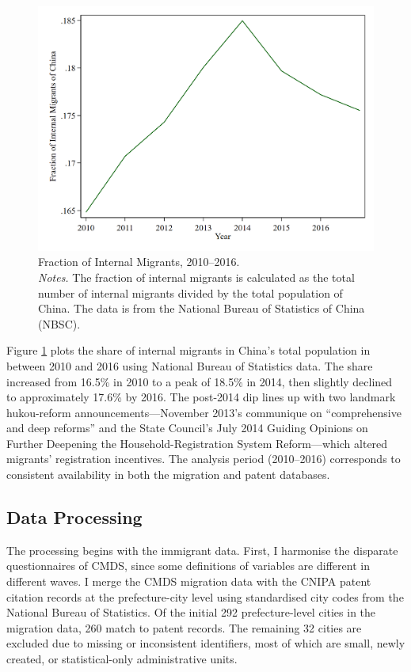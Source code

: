 \documentclass[12pt]{article}
\begin{document}
\begin{figure}[!htbp]
 \centering
 \includegraphics[width=.6\textwidth]{../Analysis/output/fraction_of_internal_migrants.png}
 \caption{Fraction of Internal Migrants, 2010--2016. \vspace{1ex} \\
    {\footnotesize \emph{Notes.} The fraction of internal migrants is calculated as the total number of internal migrants divided by the total population of China. The data is from the National Bureau of Statistics of China (NBSC).}}
  \label{fig:Fraction_of_Internal_Migrants}
\end{figure}
Figure \ref{fig:Fraction_of_Internal_Migrants} plots the share of internal migrants in China's total population in between 2010 and 2016 using National Bureau of Statistics data. The share increased from 16.5\% in 2010 to a peak of 18.5\% in 2014, then slightly declined to approximately 17.6\% by 2016. The post-2014 dip lines up with two landmark hukou-reform announcements—November 2013's communique on “comprehensive and deep reforms” and the State Council's July 2014 Guiding Opinions on Further Deepening the Household-Registration System Reform—which altered migrants' registration incentives. The analysis period (2010--2016) corresponds to consistent availability in both the migration and patent databases.

\subsection{Data Processing}\label{sec:dataprocess}
The processing begins with the immigrant data. First, I harmonise the disparate questionnaires of CMDS, since some definitions of variables are different in different waves.
I merge the CMDS migration data with the CNIPA patent citation records at the prefecture-city level using standardised city codes from the National Bureau of Statistics. Of the initial 292 prefecture-level cities in the migration data, 260 match to patent records. The remaining 32 cities are excluded due to missing or inconsistent identifiers, most of which are small, newly created, or statistical-only administrative units.
\end{document}
